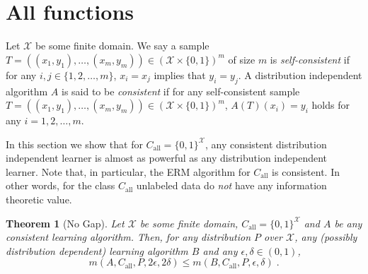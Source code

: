 \documentclass[11pt]{article}
\newtheorem{theorem}[proposition]{Theorem}
\newcommand{\X}{\mathcal{X}}
\begin{document}
\section{All functions}
\label{section:all-functions}

Let $\X$ be some finite domain. We say a sample $T = ((x_1,y_1),
\dots,(x_m,y_m)) \in (\X \times \{0,1\})^m$ of size $m$ is
\emph{self-consistent} if for any $i,j \in \{1,2,\dots,m\}$, $x_i = x_j$
implies that $y_i = y_j$. A distribution independent algorithm $A$ is said to be
\emph{consistent} if for any self-consistent sample $T = ((x_1,y_1),
\dots,(x_m,y_m)) \in (\X \times \{0,1\})^m$, $A(T)(x_i) = y_i$ holds for any
$i=1,2,\dots,m$.

In this section we show that for $C_{\text{all}} = \{0,1\}^\X$, any consistent
distribution independent learner is almost as powerful as any distribution
independent learner. Note that, in particular, the ERM algorithm for
$C_{\text{all}}$ is consistent. In other words, for the class $C_{\text{all}}$
unlabeled data do \emph{not} have any information theoretic value.

\begin{theorem}[No Gap]
Let $\X$ be some finite domain, $C_{\text{all}} = \{0,1\}^\X$ and $A$ be any
consistent learning algorithm. Then, for any distribution $P$ over $\X$, any
(possibly distribution dependent) learning algorithm $B$ and any $\epsilon, \delta \in (0,1)$,
$$
m(A,C_{\text{all}},P,2\epsilon,2\delta) \le m(B,C_{\text{all}},P,\epsilon,\delta) \; .
$$
\end{theorem}
\end{document}
